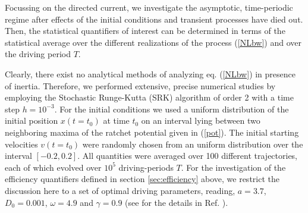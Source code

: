 \documentclass{elsart}
\begin{document}
Focussing on the directed current, we investigate the asymptotic,
time-periodic regime after effects of the initial conditions and
transient processes have died out. Then, the statistical quantifiers
of interest can be determined in terms of the statistical average over
the different realizations of the process (\ref{NLbw}) and over the
driving period $T$.

Clearly, there exist no analytical methods of analyzing eq.
(\ref{NLbw}) in presence of inertia. Therefore, we performed
extensive, precise numerical studies by employing the Stochastic
Runge-Kutta (SRK) algorithm of order 2 with a time step $h=10^{-3}$.
For the initial conditions we used a uniform distribution of the
initial position $x(t=t_0)$ at time $t_0$ on an interval lying between
two neighboring maxima of the ratchet potential given in (\ref{pot}).
The initial starting velocities $v(t=t_0)$ were randomly chosen from
an uniform distribution over the interval $[-0.2,0.2]$. All quantities
were averaged over 100 different trajectories, each of which evolved
over $10^5$ driving-periods $T$.  For the investigation of the
efficiency quantifiers defined in section \ref{sec:efficiency} above,
we restrict the discussion here to a set of optimal driving
parameters, reading, $a=3.7$, $D_0=0.001$, $\omega=4.9$ and
$\gamma=0.9$ (see for the details in Ref.  \cite{machura1,machura2}).
\end{document}
